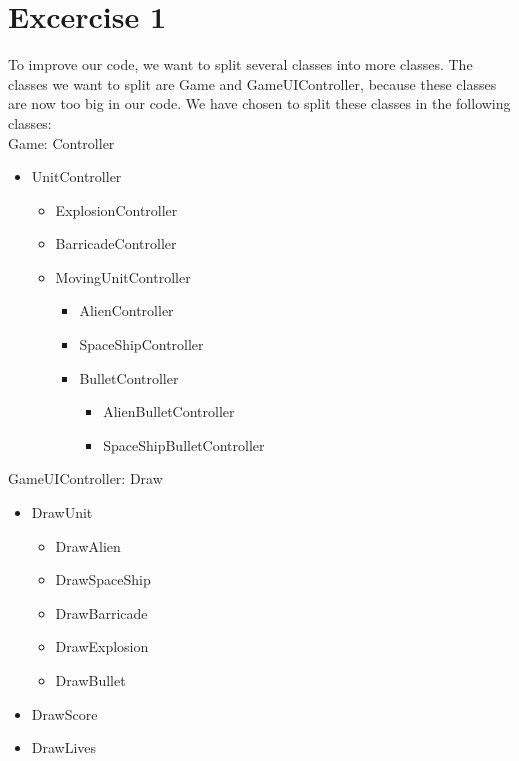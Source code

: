 \documentclass[10pt]{article}
\begin{document}
\section*{Excercise 1}
To improve our code, we want to split several classes into more classes. The classes we want to split are Game and GameUIController, because these classes are now too big in our code. We have chosen to split these classes in the following classes:\\
Game:\newline
Controller
\begin{itemize}
\item UnitController
\begin{itemize}
\item ExplosionController
\item BarricadeController	
\item MovingUnitController
\begin{itemize}
\item AlienController
\item SpaceShipController
\item BulletController
\begin{itemize}
\item AlienBulletController
\item SpaceShipBulletController
\end{itemize}
\end{itemize}
\end{itemize}
\end{itemize}
GameUIController: \newline
Draw
\begin{itemize}
\item DrawUnit
\begin{itemize}
\item DrawAlien
\item DrawSpaceShip
\item DrawBarricade
\item DrawExplosion
\item DrawBullet
\end{itemize}
\item DrawScore
\item DrawLives
\end{itemize}
\end{document}
